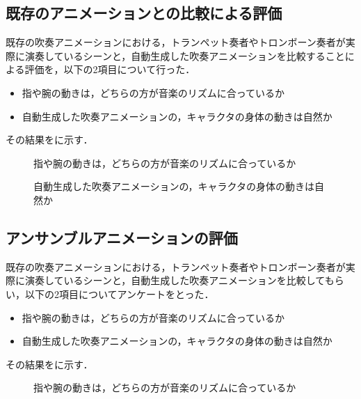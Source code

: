 \subsection{既存のアニメーションとの比較による評価}
既存の吹奏アニメーションにおける，トランペット奏者やトロンボーン奏者が実際に演奏しているシーンと，自動生成した吹奏アニメーションを比較することによる評価を，以下の2項目について行った．
\begin{itemize}
	\item 指や腕の動きは，どちらの方が音楽のリズムに合っているか
	\item 自動生成した吹奏アニメーションの，キャラクタの身体の動きは自然か
\end{itemize}
その結果をに示す．
\begin{figure}[h]
	\centering
	\hspace{2mm}
	\caption{指や腕の動きは，どちらの方が音楽のリズムに合っているか}
	\label{fig:Q2-tp}
\end{figure}

\begin{figure}[t]
	\centering
	\caption{自動生成した吹奏アニメーションの，キャラクタの身体の動きは自然か}
	\label{fig:Q2-tb}
\end{figure}

\subsection{アンサンブルアニメーションの評価}
既存の吹奏アニメーションにおける，トランペット奏者やトロンボーン奏者が実際に演奏しているシーンと，自動生成した吹奏アニメーションを比較してもらい，以下の2項目についてアンケートをとった．
\begin{itemize}
	\item 指や腕の動きは，どちらの方が音楽のリズムに合っているか
	\item 自動生成した吹奏アニメーションの，キャラクタの身体の動きは自然か
\end{itemize}
その結果をに示す．
\begin{figure}[h]
	\centering
	\hspace{2mm}
	\caption{指や腕の動きは，どちらの方が音楽のリズムに合っているか}
	\label{fig:Q3-tp}
\end{figure}

